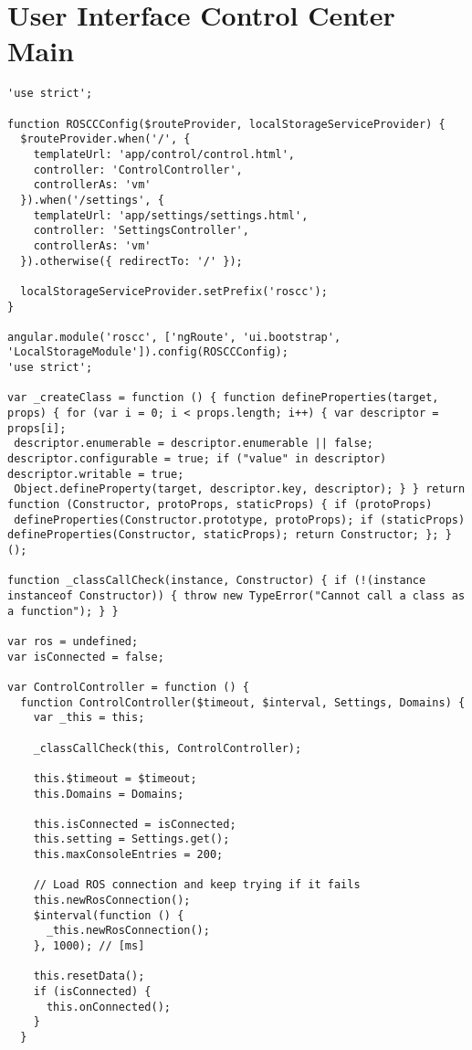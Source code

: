 \section{User Interface Control Center Main}
\begin{verbatim}
'use strict';

function ROSCCConfig($routeProvider, localStorageServiceProvider) {
  $routeProvider.when('/', {
    templateUrl: 'app/control/control.html',
    controller: 'ControlController',
    controllerAs: 'vm'
  }).when('/settings', {
    templateUrl: 'app/settings/settings.html',
    controller: 'SettingsController',
    controllerAs: 'vm'
  }).otherwise({ redirectTo: '/' });

  localStorageServiceProvider.setPrefix('roscc');
}

angular.module('roscc', ['ngRoute', 'ui.bootstrap', 'LocalStorageModule']).config(ROSCCConfig);
'use strict';

var _createClass = function () { function defineProperties(target, props) { for (var i = 0; i < props.length; i++) { var descriptor = props[i];
 descriptor.enumerable = descriptor.enumerable || false; descriptor.configurable = true; if ("value" in descriptor) descriptor.writable = true; 
 Object.defineProperty(target, descriptor.key, descriptor); } } return function (Constructor, protoProps, staticProps) { if (protoProps) 
 defineProperties(Constructor.prototype, protoProps); if (staticProps) defineProperties(Constructor, staticProps); return Constructor; }; }();

function _classCallCheck(instance, Constructor) { if (!(instance instanceof Constructor)) { throw new TypeError("Cannot call a class as a function"); } }

var ros = undefined;
var isConnected = false;

var ControlController = function () {
  function ControlController($timeout, $interval, Settings, Domains) {
    var _this = this;

    _classCallCheck(this, ControlController);

    this.$timeout = $timeout;
    this.Domains = Domains;

    this.isConnected = isConnected;
    this.setting = Settings.get();
    this.maxConsoleEntries = 200;

    // Load ROS connection and keep trying if it fails
    this.newRosConnection();
    $interval(function () {
      _this.newRosConnection();
    }, 1000); // [ms]

    this.resetData();
    if (isConnected) {
      this.onConnected();
    }
  }


\end{verbatim}
